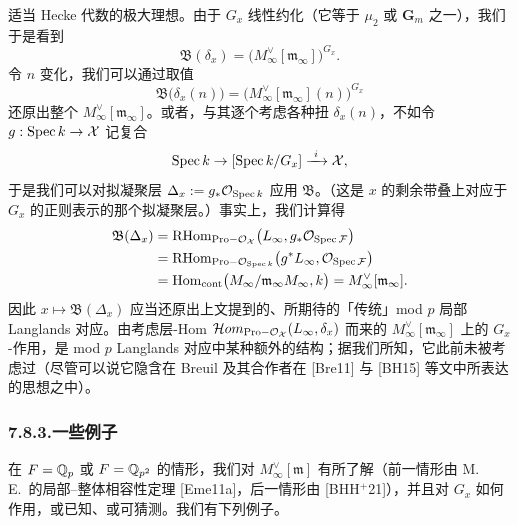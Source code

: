 适当 Hecke 代数的极大理想。由于 $G_x$ 线性约化（它等于 $\mu_2$ 或 $\mathbf G_m$ 之一），我们于是看到
\[
\mathfrak B(\delta_x)=\bigl(M_\infty^\vee[\mathfrak m_\infty]\bigr)^{G_x}.
\]
令 $n$ 变化，我们可以通过取值
\[
\mathfrak B\bigl(\delta_x(n)\bigr)=\bigl(M_\infty^\vee[\mathfrak m_\infty](n)\bigr)^{G_x}
\]
还原出整个 $M_\infty^\vee[\mathfrak m_\infty]$。或者，与其逐个考虑各种扭 $\delta_x(n)$，不如令 $g:\operatorname{Spec} k\rightarrow\mathcal{X}$ 记复合
\[
\Spec k\ra[\Spec k/G_x]\xrightarrow{\ i\ }\XX,
\]
于是我们可以对拟凝聚层 $\Delta_x:=g_*\mathcal{O}_{\operatorname{Spec} k}$ 应用 $\mathfrak B$。（这是 $x$ 的剩余带叠上对应于 $G_x$ 的正则表示的那个拟凝聚层。）事实上，我们计算得
\[
\begin{aligned}
\mathfrak B(\Delta_x)&=\mathrm{RHom}_{\mathrm{Pro-}\mathcal{O}_{\mathcal{X}}}\bigl(L_\infty,g_*\mathcal{O}_{\operatorname{Spec}\mathcal F}\bigr)\\
&=\mathrm{RHom}_{\mathrm{Pro-}\mathcal{O}_{\operatorname{Spec} k}}\bigl(g^*L_\infty,\mathcal{O}_{\operatorname{Spec}\mathcal F}\bigr)\\
&=\operatorname{Hom}_{\mathrm{cont}}\bigl(M_\infty/\mathfrak m_\infty M_\infty,k\bigr)=M_\infty^\vee[\mathfrak m_\infty].
\end{aligned}
\]
因此 $x\mapsto\mathfrak B(\Delta_x)$ 应当还原出上文提到的、所期待的「传统」mod $p$ 局部 Langlands 对应。由考虑层-Hom $\mathcal Hom_{\mathrm{Pro-}\mathcal{O}_{\mathcal{X}}}(L_\infty,\delta_x)$ 而来的 $M_\infty^\vee[\mathfrak m_\infty]$ 上的 $G_x$-作用，是 mod $p$ Langlands 对应中某种额外的结构；据我们所知，它此前未被考虑过（尽管可以说它隐含在 Breuil 及其合作者在 [Bre11] 与 [BH15] 等文中所表达的思想之中）。

\subsubsection*{7.8.3.\quad 一些例子}
在 $F=\mathbb{Q}_p$ 或 $F=\mathbb{Q}_{p^2}$ 的情形，我们对 $M_\infty^\vee[\mathfrak m]$ 有所了解（前一情形由 M.\,E.\ 的局部--整体相容性定理 [Eme11a]，后一情形由 [BHH${}^{+}$21]），并且对 $G_x$ 如何作用，或已知、或可猜测。我们有下列例子。

